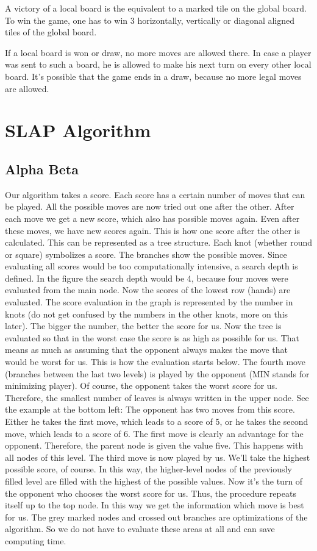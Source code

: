 A victory of a local board is the equivalent to a marked tile on the global board. To win the game, one has to win 3 horizontally, vertically or diagonal aligned tiles of the global board.

If a local board is won or draw, no more moves are allowed there. In case a player was sent to such a board, he is allowed to make his next turn on every other local board. It's possible that the game ends in a draw, because  no more legal moves are allowed.

\section{SLAP Algorithm}

\subsection{Alpha Beta}
Our algorithm takes a score. Each score has a certain number of moves that can be played. All the possible moves are now tried out one after the other. After each move we get a new score, which also has possible moves again. Even after these moves, we have new scores again. This is how one score after the other is calculated. This can be represented as a tree structure. Each knot (whether round or square) symbolizes a score. The branches show the possible moves. Since evaluating all scores would be too computationally intensive, a search depth is defined. In the figure the search depth would be 4, because four moves were evaluated from the main node. Now the scores of the lowest row (hands) are evaluated. The score evaluation in the graph is represented by the number in knots (do not get confused by the numbers in the other knots, more on this later). The bigger the number, the better the score for us. Now the tree is evaluated so that in the worst case the score is as high as possible for us. That means as much as assuming that the opponent always makes the move that would be worst for us. This is how the evaluation starts below. The fourth move (branches between the last two levels) is played by the opponent (MIN stands for minimizing player). Of course, the opponent takes the worst score for us. Therefore, the smallest number of leaves is always written in the upper node. See the example at the bottom left:
The opponent has two moves from this score. Either he takes the first move, which leads to a score of 5, or he takes the second move, which leads to a score of 6. The first move is clearly an advantage for the opponent. Therefore, the parent node is given the value five. This happens with all nodes of this level. The third move is now played by us. We'll take the highest possible score, of course. In this way, the higher-level nodes of the previously filled level are filled with the highest of the possible values. Now it's the turn of the opponent who chooses the worst score for us. Thus, the procedure repeats itself up to the top node. In this way we get the information which move is best for us. The grey marked nodes and crossed out branches are optimizations of the algorithm. So we do not have to evaluate these areas at all and can save computing time.

